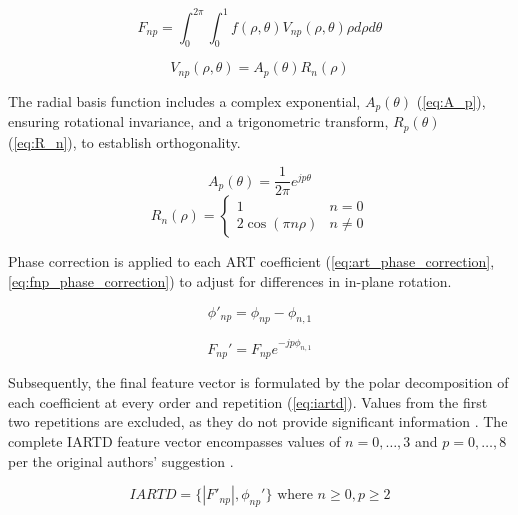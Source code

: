 \begin{equation}
	\label{eq:F_np}
	F_{np} = \int_{0}^{2\pi}\int_{0}^{1}f(\rho,\theta)V_{np}(\rho,\theta)\rho d\rho d\theta
\end{equation}

\begin{equation}
	\label{eq:V_np}
	V_{np}(\rho,\theta) = A_{p}(\theta)R_{n}(\rho)
\end{equation}

The radial basis function includes a complex exponential, $A_{p}(\theta)$ (\cref{eq:A_p}), ensuring rotational invariance, and a trigonometric transform, $R_{p}(\theta)$ (\cref{eq:R_n}), to establish orthogonality.

\begin{equation}
	\label{eq:A_p}
	A_{p}(\theta) = \dfrac{1}{2\pi}e^{jp\theta}
\end{equation}
\begin{equation}
	\label{eq:R_n}
	R_{n}(\rho) =
	\begin{cases}
		1                   & n=0     \\
		2 \cos (\pi n \rho) & n \ne 0
	\end{cases}
\end{equation}

Phase correction is applied to each ART coefficient (\cref{eq:art_phase_correction}, \cref{eq:fnp_phase_correction}) to adjust for differences in in-plane rotation.

\begin{equation}
	\label{eq:art_phase_correction}
	\phi'_{np} = \phi_{np} - \phi_{n,1}
\end{equation}

\begin{equation}
	\label{eq:fnp_phase_correction}
	F_{np}' = F_{np}e^{-jp\phi_{n,1}}
\end{equation}

Subsequently, the final feature vector is formulated by the polar decomposition of each coefficient at every order and repetition (\cref{eq:iartd}).
Values from the first two repetitions are excluded, as they do not provide significant information \cite{leeNewShapeDescription2012}.
The complete IARTD feature vector encompasses values of $n={0, \dots, 3 }$ and $p={0, \dots, 8}$ per the original authors' suggestion \cite{leeNewShapeDescription2012}.

\begin{equation}
	\label{eq:iartd}
	IARTD = \{|F'_{np}|, \phi_{np}'\} \text{ where } n \ge 0, p \ge 2
\end{equation}

